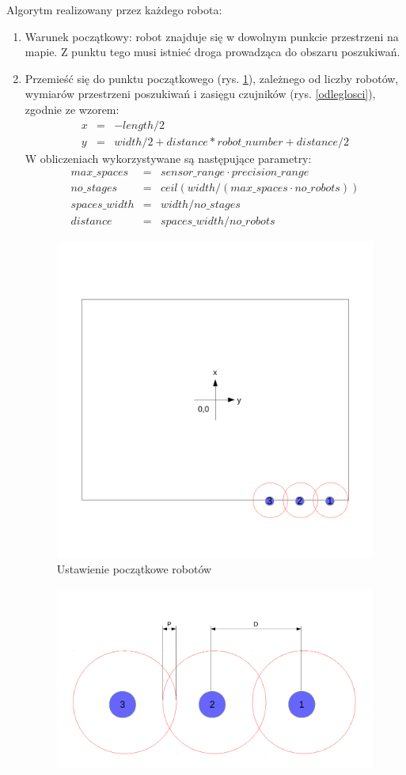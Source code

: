 \documentclass[a4paper, 12pt]{article}
\begin{document}
		Algorytm realizowany przez każdego robota:
		\begin{enumerate}
		\item Warunek początkowy: robot znajduje się w dowolnym punkcie przestrzeni na mapie. Z punktu tego musi istnieć droga prowadząca do obszaru poszukiwań.
		\item Przemieść się do punktu początkowego (rys. \ref{plansza}), zależnego od liczby robotów, wymiarów przestrzeni poszukiwań i zasięgu czujników (rys. \ref{odleglosci}), zgodnie ze wzorem:		
		\begin{eqnarray}
		x &=& -length / 2 \\
		y &=& width / 2 + distance * robot\_number + distance / 2 \nonumber
		\end{eqnarray}
		W obliczeniach wykorzystywane są następujące parametry:
		\begin{eqnarray}
		max\_spaces &=& sensor\_range \cdot precision\_range\nonumber \\
		no\_stages &=& ceil(width / (max\_spaces \cdot no\_robots))\nonumber\\
		spaces\_width &=& width / no\_stages\nonumber\\
		distance &=& spaces\_width/no\_robots\nonumber
		\end{eqnarray}
		\begin{figure}[h!]
			\centering
			\includegraphics*[width=0.7\columnwidth]{img/plansza.pdf}
			\caption{Ustawienie początkowe robotów}
			\label{plansza}
		\end{figure}
		\begin{figure}[h!]
			\centering
			\includegraphics*[width=0.7\columnwidth]{img/odleglosci.pdf}

\end{figure}
\end{enumerate}
\end{document}
